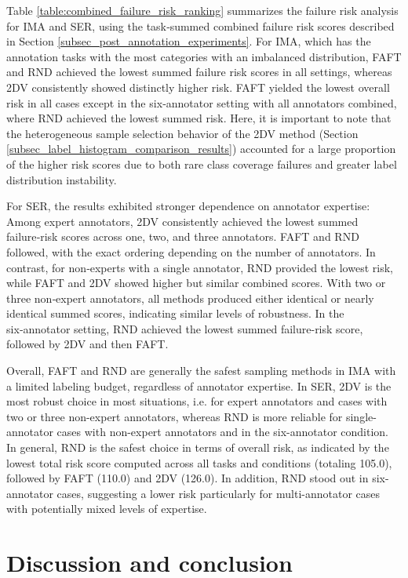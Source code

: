 \documentclass[a4paper,fleqn]{cas-dc}
\begin{document}
Table \ref{table:combined_failure_risk_ranking} summarizes the failure risk analysis for IMA and SER, using the task‑summed combined failure risk scores described in Section \ref{subsec_post_annotation_experiments}. For IMA, which has the annotation tasks with the most categories with an imbalanced distribution, FAFT and RND achieved the lowest summed failure risk scores in all settings, whereas 2DV consistently showed distinctly higher risk. FAFT yielded the lowest overall risk in all cases except in the six‑annotator setting with all annotators combined, where RND achieved the lowest summed risk. Here, it is important to note that the heterogeneous sample selection behavior of the 2DV method (Section \ref{subsec_label_histogram_comparison_results}) accounted for a large proportion of the higher risk scores due to both rare class coverage failures and greater label distribution instability.

For SER, the results exhibited stronger dependence on annotator expertise: Among expert annotators, 2DV consistently achieved the lowest summed failure‑risk scores across one, two, and three annotators. FAFT and RND followed, with the exact ordering depending on the number of annotators. In contrast, for non‑experts with a single annotator, RND provided the lowest risk, while FAFT and 2DV showed higher but similar combined scores. With two or three non‑expert annotators, all methods produced either identical or nearly identical summed scores, indicating similar levels of robustness. In the six‑annotator setting, RND achieved the lowest summed failure-risk score, followed by 2DV and then FAFT.

Overall, FAFT and RND are generally the safest sampling methods in IMA with a limited labeling budget, regardless of annotator expertise. In SER, 2DV is the most robust choice in most situations, i.e. for expert annotators and cases with two or three non-expert annotators, whereas RND is more reliable for single-annotator cases with non-expert annotators and in the six-annotator condition. In general, RND is the safest choice in terms of overall risk, as indicated by the lowest total risk score computed across all tasks and conditions (totaling 105.0), followed by FAFT (110.0) and 2DV (126.0). In addition, RND stood out in six-annotator cases, suggesting a lower risk particularly for multi-annotator cases with potentially mixed levels of expertise.



\section{Discussion and conclusion} \label{sec_conclusion}
\end{document}

